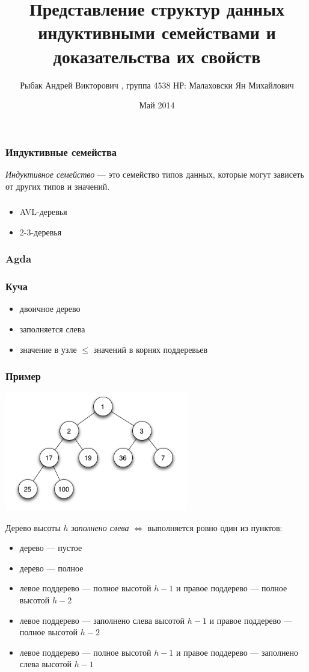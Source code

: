 \documentclass[30pt]{beamer}
\title[Представление структур данных индуктивными семействами и доказательства их свойств]{Представление структур данных индуктивными семействами и доказательства их свойств}
\institute{НИУ ИТМО}
\author[Рыбак А.В.]{Рыбак Андрей Викторович , группа 4538
\newline НР: Малаховски Ян Михайлович}
\date{
Май 2014
}
\begin{document}
\maketitle

\begin{frame}
    \frametitle{Индуктивные семейства}
        \emph{Индуктивное семейство} — это семейство типов данных,
        которые могут зависеть от других типов и значений.
\end{frame}

\begin{frame}
    \frametitle{}
    \begin{itemize}
        \item AVL-деревья
        \item 2-3-деревья
    \end{itemize}
\end{frame}

\begin{frame}
    \frametitle{Agda}
    
\end{frame}

\begin{frame}
    \frametitle{Куча}
    \begin{itemize}
        \item двоичное дерево
        \item заполняется слева
        \item значение в узле $ \leq $ значений в корнях поддеревьев
    \end{itemize}
\end{frame}
\begin{frame}
    \frametitle{Пример}
    \includegraphics[width=0.6\textwidth]{pic/min-heap.png}
\end{frame}
\begin{frame}
Дерево высоты $h$ \emph{заполнено слева} $ \iff $
выполняется ровно один из пунктов:
  \begin{itemize}
    \item дерево — пустое
    \item дерево — полное
    \item левое поддерево — полное высотой $h-1$ и правое поддерево — полное высотой $h-2$
    \item левое поддерево — заполнено слева высотой $h-1$ и правое поддерево — полное высотой $h-2$
    \item левое поддерево — полное высотой $h-1$ и правое поддерево — заполнено слева высотой $h-1$
  \end{itemize}

\end{frame}
\begin{frame}
    
\end{frame}
\end{document}
